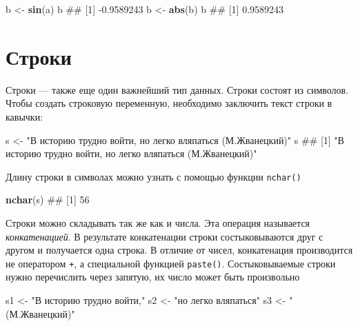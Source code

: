 \documentclass[]{book}
\newenvironment{Shaded}{\begin{snugshade}}{\end{snugshade}}
\newcommand{\KeywordTok}[1]{\textcolor[rgb]{0.13,0.29,0.53}{\textbf{#1}}}
\newcommand{\StringTok}[1]{\textcolor[rgb]{0.31,0.60,0.02}{#1}}
\newcommand{\NormalTok}[1]{#1}
\begin{document}
\begin{Shaded}
\begin{Highlighting}[]
\NormalTok{b <-}\StringTok{ }\KeywordTok{sin}\NormalTok{(a)}
\NormalTok{b}
\NormalTok{## [1] -0.9589243}
\NormalTok{b <-}\StringTok{ }\KeywordTok{abs}\NormalTok{(b)}
\NormalTok{b}
\NormalTok{## [1] 0.9589243}
\end{Highlighting}
\end{Shaded}

\section{Строки}

Строки --- также еще один важнейший тип данных. Строки состоят из
символов. Чтобы создать строковую переменную, необходимо заключить текст
строки в кавычки:

\begin{Shaded}
\begin{Highlighting}[]
\NormalTok{s <-}\StringTok{ "В историю трудно войти, но легко вляпаться (М.Жванецкий)"}
\NormalTok{s}
\NormalTok{## [1] "В историю трудно войти, но легко вляпаться (М.Жванецкий)"}
\end{Highlighting}
\end{Shaded}

Длину строки в символах можно узнать с помощью функции \texttt{nchar()}

\begin{Shaded}
\begin{Highlighting}[]
\KeywordTok{nchar}\NormalTok{(s)}
\NormalTok{## [1] 56}
\end{Highlighting}
\end{Shaded}

Строки можно складывать так же как и числа. Эта операция называется
\emph{конкатенацией}. В результате конкатенации строки состыковываются
друг с другом и получается одна строка. В отличие от чисел, конкатенация
производится не оператором \texttt{+}, а специальной функцией
\texttt{paste()}. Состыковываемые строки нужно перечислить через
запятую, их число может быть произвольно

\begin{Shaded}
\begin{Highlighting}[]
\NormalTok{s1 <-}\StringTok{ "В историю трудно войти,"}
\NormalTok{s2 <-}\StringTok{ "но легко вляпаться"}
\NormalTok{s3 <-}\StringTok{ "(М.Жванецкий)"}
\end{Highlighting}
\end{Shaded}
\end{document}

